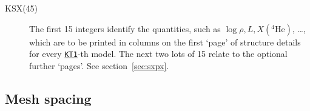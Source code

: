 \begin{description}
\item[KSX(45)]\hypertarget{ksx}{} The first 15 integers identify the quantities, such as $\log  \rho, L, X(^4\mathrm{He})$, \ldots, which are to be printed in 
  columns on the first `page' of structure details for every \hyperlink{kt1}{\texttt{KT1}}-th model. The next two lots of 15 relate 
  to the optional further `pages'. See section~\ref{sec:sxpx}.
\end{description}





\subsection{Mesh spacing}
\label{sec:initdat:mesh}

